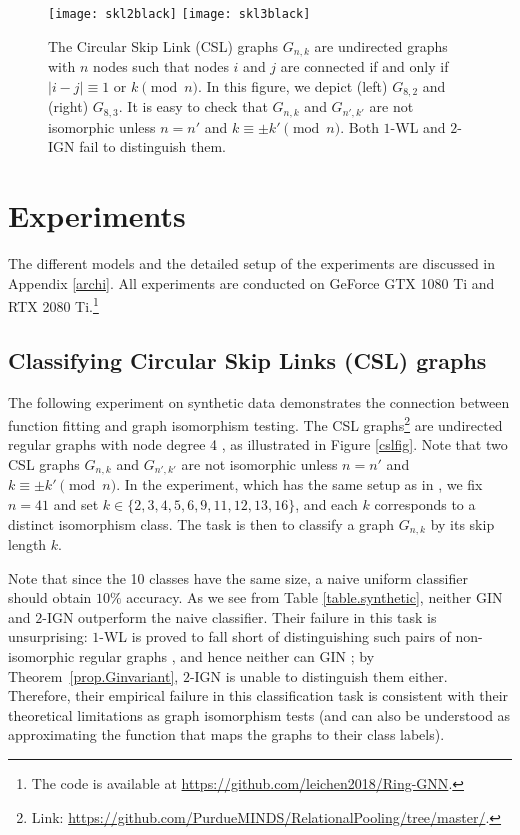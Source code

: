 \documentclass{article}
\begin{document}
\begin{figure}
    \label{cslfig}
    \centering
    \texttt{[image: skl2black]}
    \texttt{[image: skl3black]}
    \caption{The Circular Skip Link (CSL) graphs $G_{n,k}$ are undirected graphs with $n$ nodes such that nodes $i$ and $j$ are connected if and only if $|i-j|\equiv 1 \text{ or } k \pmod n$. In this figure, we depict (left) $G_{8,2}$ and (right) $G_{8,3}$. It is easy to check that $G_{n,k}$ and $G_{n',k'}$ are not isomorphic unless $n=n'$ and $k\equiv \pm k' \pmod n$. Both $1$-WL and $2$-IGN fail to distinguish them.}
    \label{fig.skiplength}
\end{figure}

\section{Experiments}
\label{experiments}
The different models and the detailed setup of the experiments are discussed in Appendix \ref{archi}. All experiments are conducted on GeForce GTX 1080 Ti and RTX 2080 Ti.\footnote{The code is available at  \url{https://github.com/leichen2018/Ring-GNN}.}

\subsection{Classifying Circular Skip Links (CSL) graphs}
\label{cslexp}
The following experiment on synthetic data demonstrates the connection between function fitting and graph isomorphism testing. The CSL graphs\footnote{Link: \url{https://github.com/PurdueMINDS/RelationalPooling/tree/master/}.} are undirected regular graphs with node degree 4 \cite{murphy2019relational}, as illustrated in Figure \ref{cslfig}. Note that two CSL graphs $G_{n,k}$ and $G_{n',k'}$ are not isomorphic unless $n=n'$ and $k\equiv \pm k' \pmod n$. In the experiment, which has the same setup as in \cite{murphy2019relational}, we fix $n=41$ and set $k \in \{2, 3, 4, 5, 6, 9, 11, 12, 13, 16 \}$, and each $k$ corresponds to a distinct isomorphism class. The task is then to classify a graph $G_{n, k}$ by its skip length $k$.

Note that since the 10 classes have the same size, a naive uniform classifier should obtain $10\%$ accuracy. As we see from Table \ref{table.synthetic}, neither GIN and $2$-IGN outperform the naive classifier. Their failure in this task is unsurprising: $1$-WL is proved to fall short of distinguishing such pairs of non-isomorphic regular graphs \cite{cai1992optimal}, and hence neither can GIN \cite{xu2018powerful}; by Theorem~\ref{prop.Ginvariant}, $2$-IGN is unable to distinguish them either. Therefore, their empirical failure in this classification task is consistent with their theoretical limitations as graph isomorphism tests (and can also be understood as approximating the function that maps the graphs to their class labels).
\end{document}
